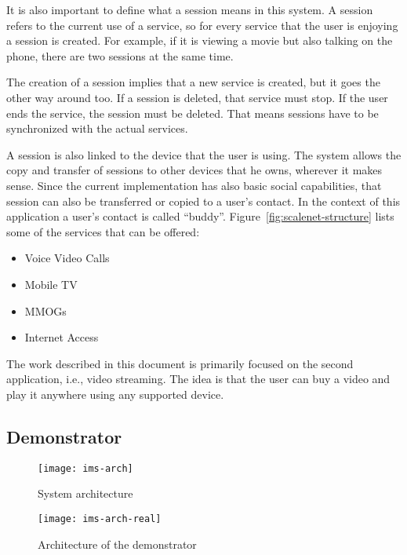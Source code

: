 It is also important to define what a session means in this system.
A session refers to the current use of a service, so for every service that the user is enjoying a session is created.
For example, if it is viewing a movie but also talking on the  phone, there are two sessions at the same time.

The creation of a session implies that a new service is created, but it goes the other way around too.
If a session is deleted, that service must stop.
If the user ends the service, the session must be deleted.
That means sessions have to be synchronized with the actual services.

A session is also linked to the device that the user is using.
The system allows the copy and transfer of sessions to other devices that he owns, wherever it makes sense.
Since the current implementation has also basic social capabilities, that session can also be transferred or copied to a user's contact.
In the context of this application a user's contact is called ``buddy''.
Figure~\ref{fig:scalenet-structure} lists some of the services that can be offered:

\begin{itemize}
  \item Voice \et{} Video Calls
  \item Mobile TV \et{} 
  \item {}\acp{MMOG}
  \item Internet Access
\end{itemize}

The work described in this document is primarily focused on the second application, i.e., video streaming.
The idea is that the user can buy a video and play it anywhere using any supported device.

\nicesubsectionending


\subsection{ Demonstrator} %
\label{sub:demonstrator}

\begin{figure}[p]
  \centering
    \texttt{[image: ims-arch]}
  \caption{System architecture}
  \label{fig:ims-arch}
\end{figure}

\begin{figure}[p]
  \centering
    \texttt{[image: ims-arch-real]}
  \caption{Architecture of the demonstrator}
  \label{fig:ims-arch-real}
\end{figure}

